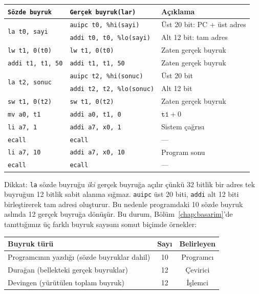 \begin{ornek}[4.2]
\begin{center}
\small
\begin{tabular}{lll}
\toprule
\texttt{Sözde buyruk} & \texttt{Gerçek buyruk(lar)} & Açıklama \\
\midrule
\multirow{2}{*}{\texttt{la t0, sayi}} & \texttt{auipc t0, \%hi(sayi)} & Üst 20 bit: PC + üst adres \\
                                       & \texttt{addi t0, t0, \%lo(sayi)} & Alt 12 bit: tam adres \\
\texttt{lw t1, 0(t0)} & \texttt{lw t1, 0(t0)} & Zaten gerçek buyruk \\
\texttt{addi t1, t1, 50} & \texttt{addi t1, t1, 50} & Zaten gerçek buyruk \\
\multirow{2}{*}{\texttt{la t2, sonuc}} & \texttt{auipc t2, \%hi(sonuc)} & Üst 20 bit \\
                                        & \texttt{addi t2, t2, \%lo(sonuc)} & Alt 12 bit \\
\texttt{sw t1, 0(t2)} & \texttt{sw t1, 0(t2)} & Zaten gerçek buyruk \\
\texttt{mv a0, t1}  & \texttt{addi a0, t1, 0}  & $\texttt{t1} + 0$ \\
\texttt{li a7, 1}   & \texttt{addi a7, x0, 1}  & Sistem çağrısı \\
\texttt{ecall}       & \texttt{ecall}            & --- \\
\texttt{li a7, 10}  & \texttt{addi a7, x0, 10} & Program sonu \\
\texttt{ecall}       & \texttt{ecall}            & --- \\
\bottomrule
\end{tabular}
\end{center}

Dikkat: \texttt{la} sözde buyruğu \emph{iki} gerçek buyruğa açılır çünkü 32 bitlik bir adres tek buyruğun 12 bitlik sabit alanına sığmaz. \texttt{auipc} üst 20 biti, \texttt{addi} alt 12 biti birleştirerek tam adresi oluşturur. Bu nedenle programdaki 10 sözde buyruk aslında 12 gerçek buyruğa dönüşür. Bu durum, Bölüm~\ref{chap:basarim}'de tanıttığımız üç farklı buyruk sayısını somut biçimde örnekler:

\begin{center}
\small
\begin{tabular}{lcc}
\toprule
Buyruk türü & Sayı & Belirleyen \\
\midrule
Programcının yazdığı (sözde buyruklar dahil) & 10 & Programcı \\
Durağan (bellekteki gerçek buyruklar) & 12 & Çevirici \\
Devingen (yürütülen toplam buyruk) & 12 & İşlemci \\
\bottomrule
\end{tabular}
\end{center}


\end{ornek}

